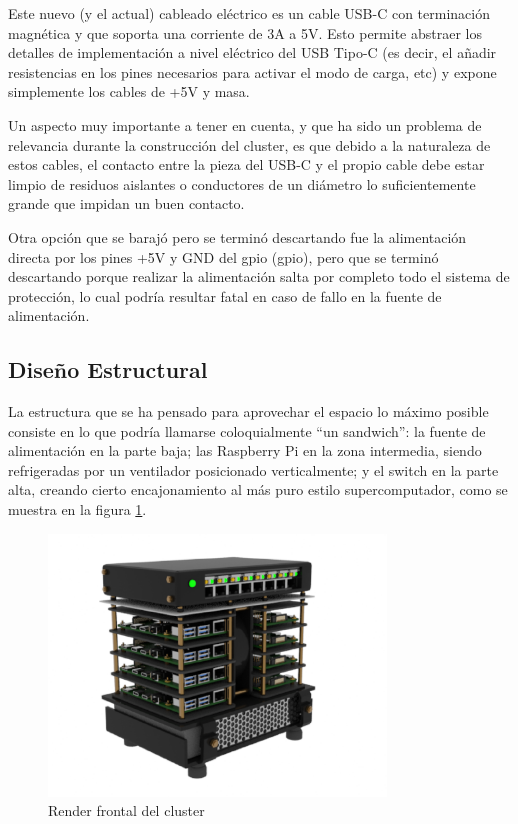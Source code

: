 Este nuevo (y el actual) cableado eléctrico es un cable USB-C con terminación magnética y que soporta una corriente de 3A a 5V. Esto permite abstraer los detalles de implementación a nivel eléctrico del USB Tipo-C (es decir, el añadir resistencias en los pines necesarios para activar el modo de carga, etc) y expone simplemente los cables de +5V y masa.

Un aspecto muy importante a tener en cuenta, y que ha sido un problema de relevancia durante la construcción del cluster, es que debido a la naturaleza de estos cables, el contacto entre la pieza del USB-C y el propio cable debe estar limpio de residuos aislantes o conductores de un diámetro lo suficientemente grande que impidan un buen contacto.

Otra opción que se barajó pero se terminó descartando fue la alimentación directa por los pines +5V y GND del \acrshort{gpio} (\acrlong{gpio}), pero que se terminó descartando porque realizar la alimentación salta por completo todo el sistema de protección, lo cual podría resultar fatal en caso de fallo en la fuente de alimentación.



\subsection{Diseño Estructural}
\label{ssec:diseño_estructural}
La estructura que se ha pensado para aprovechar el espacio lo máximo posible consiste en lo que podría llamarse coloquialmente ``un sandwich'': la fuente de alimentación en la parte baja; las Raspberry Pi en la zona intermedia, siendo refrigeradas por un ventilador posicionado verticalmente; y el switch en la parte alta, creando cierto encajonamiento al más puro estilo supercomputador, como se muestra en la figura \ref{fig:render_cluster_1}.

\begin{figure}[h!]
  \centering
  \includegraphics[width=0.8\textwidth]{img/render_cluster_1_provisional.png}
  \caption{Render frontal del cluster}
  \label{fig:render_cluster_1}
\end{figure}


